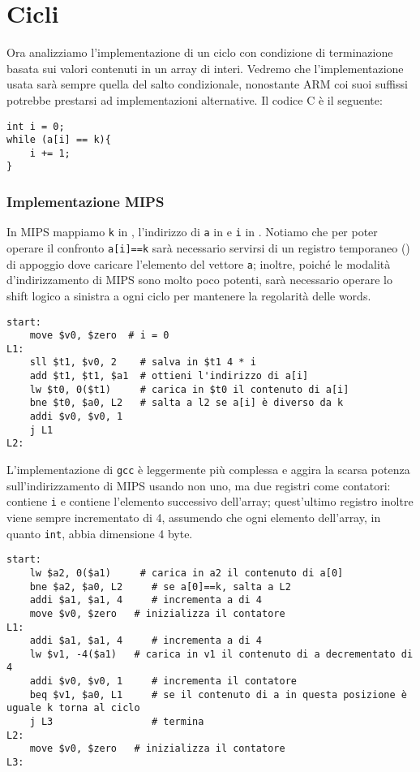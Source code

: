 \documentclass[class=book, crop=false, oneside]{standalone}
\begin{document}
\section{Cicli}
Ora analizziamo l'implementazione di un ciclo con condizione di terminazione basata sui valori contenuti in un array di interi. Vedremo che l'implementazione usata sarà sempre quella del salto condizionale, nonostante ARM coi suoi suffissi potrebbe prestarsi ad implementazioni alternative. Il codice C è il seguente:
\begin{verbatim}
int i = 0;
while (a[i] == k){
	i += 1;
}
\end{verbatim}

\subsubsection{Implementazione MIPS}
In MIPS mappiamo \texttt{k} in , l'indirizzo di \texttt{a} in  e \texttt{i} in . Notiamo che per poter operare il confronto \texttt{a[i]==k} sarà necessario servirsi di un registro temporaneo () di appoggio dove caricare l'elemento del vettore \texttt{a}; inoltre, poiché le modalità d'indirizzamento di MIPS sono molto poco potenti, sarà necessario operare lo shift logico a sinistra a ogni ciclo per mantenere la regolarità delle words.
\begin{verbatim}
start:
	move $v0, $zero	 # i = 0
L1:
	sll $t1, $v0, 2    # salva in $t1 4 * i
	add $t1, $t1, $a1  # ottieni l'indirizzo di a[i]
	lw $t0, 0($t1)     # carica in $t0 il contenuto di a[i]
	bne $t0, $a0, L2   # salta a l2 se a[i] è diverso da k
	addi $v0, $v0, 1
	j L1
L2:
\end{verbatim}

L'implementazione di \texttt{gcc} è leggermente più complessa e aggira la scarsa potenza sull'indirizzamento di MIPS usando non uno, ma due registri come contatori:   contiene \texttt{i} e  contiene l'elemento successivo dell'array; quest'ultimo registro inoltre viene sempre incrementato di 4, assumendo che ogni elemento dell'array, in quanto \texttt{int}, abbia dimensione 4 byte.
\begin{verbatim}
start:
	lw $a2, 0($a1)	   # carica in a2 il contenuto di a[0]
	bne $a2, $a0, L2	 # se a[0]==k, salta a L2
	addi $a1, $a1, 4	 # incrementa a di 4
	move $v0, $zero	  # inizializza il contatore
L1:
	addi $a1, $a1, 4	 # incrementa a di 4
	lw $v1, -4($a1)	  # carica in v1 il contenuto di a decrementato di 4
	addi $v0, $v0, 1	 # incrementa il contatore
	beq $v1, $a0, L1	 # se il contenuto di a in questa posizione è uguale k torna al ciclo
	j L3	             # termina
L2:
	move $v0, $zero	  # inizializza il contatore
L3:
\end{verbatim}
\end{document}
